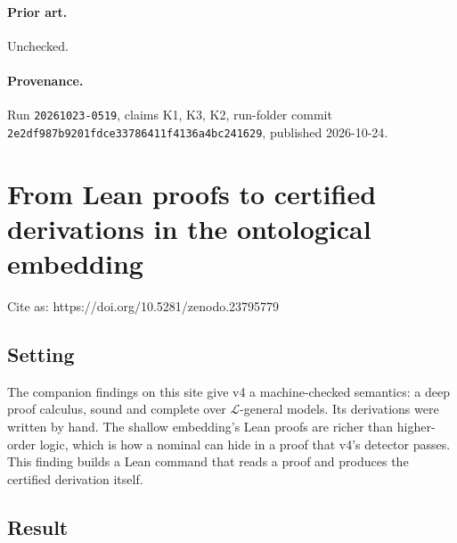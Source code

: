 \documentclass{article}
\begin{document}
\paragraph{Prior art.} Unchecked.

\paragraph{Provenance.}
Run \texttt{20261023-0519}, claims K1, K3, K2, run-folder commit \texttt{2e2df987b9201fdce33786411f4136a4bc241629}, published 2026-10-24.

\section{From Lean proofs to certified derivations in the ontological embedding}
\label{sec:ontological-proof-translation}

Cite as: https://doi.org/10.5281/zenodo.23795779

\subsection*{Setting}

The companion findings on this site give v4 \cite{benzmueller2026nominals} a machine-checked
semantics: a deep proof calculus, sound and complete over $\mathcal L$-general models. Its
derivations were written by hand. The shallow embedding's Lean proofs are richer than
higher-order logic, which is how a nominal can hide in a proof that v4's detector passes. This
finding builds a Lean command that reads a proof and produces the certified derivation itself.

\subsection*{Result}
\end{document}
